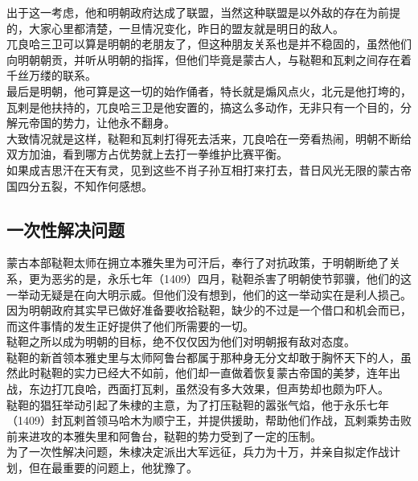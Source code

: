 \begin{multicols}{\theparacolNo}
出于这一考虑，他和明朝政府达成了联盟，当然这种联盟是以外敌的存在为前提的，大家心里都清楚，一旦情况变化，昨日的盟友就是明日的敌人。\\

兀良哈三卫可以算是明朝的老朋友了，但这种朋友关系也是并不稳固的，虽然他们向明朝朝贡，并听从明朝的指挥，但他们毕竟是蒙古人，与鞑靼和瓦剌之间存在着千丝万缕的联系。\\

最后是明朝，他可算是这一切的始作俑者，特长就是煽风点火，北元是他打垮的，瓦剌是他扶持的，兀良哈三卫是他安置的，搞这么多动作，无非只有一个目的，分解元帝国的势力，让他永不翻身。\\

大致情况就是这样，鞑靼和瓦剌打得死去活来，兀良哈在一旁看热闹，明朝不断给双方加油，看到哪方占优势就上去打一拳维护比赛平衡。\\

如果成吉思汗在天有灵，见到这些不肖子孙互相打来打去，昔日风光无限的蒙古帝国四分五裂，不知作何感想。\\

\subsection{一次性解决问题}
蒙古本部鞑靼太师在拥立本雅失里为可汗后，奉行了对抗政策，于明朝断绝了关系，更为恶劣的是，永乐七年（1409）四月，鞑靼杀害了明朝使节郭骥，他们的这一举动无疑是在向大明示威。但他们没有想到，他们的这一举动实在是利人损己。\\

因为明朝政府其实早已做好准备要收拾鞑靼，缺少的不过是一个借口和机会而已，而这件事情的发生正好提供了他们所需要的一切。\\

鞑靼之所以成为明朝的目标，绝不仅仅因为他们对明朝报有敌对态度。\\

鞑靼的新首领本雅史里与太师阿鲁台都属于那种身无分文却敢于胸怀天下的人，虽然此时鞑靼的实力已经大不如前，他们却一直做着恢复蒙古帝国的美梦，连年出战，东边打兀良哈，西面打瓦剌，虽然没有多大效果，但声势却也颇为吓人。\\

鞑靼的猖狂举动引起了朱棣的主意，为了打压鞑靼的嚣张气焰，他于永乐七年（1409）封瓦剌首领马哈木为顺宁王，并提供援助，帮助他们作战，瓦剌乘势击败前来进攻的本雅失里和阿鲁台，鞑靼的势力受到了一定的压制。\\

为了一次性解决问题，朱棣决定派出大军远征，兵力为十万，并亲自拟定作战计划，但在最重要的问题上，他犹豫了。\\


\end{multicols}
